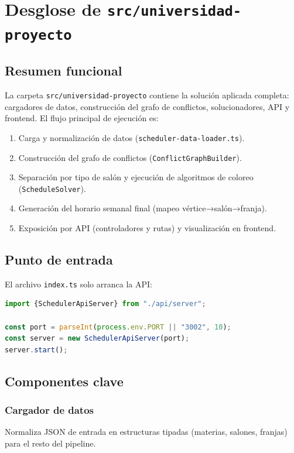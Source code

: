 \chapter{Desglose de \texttt{src/universidad-proyecto}}

\section{Resumen funcional}

La carpeta \texttt{src/universidad-proyecto} contiene la solución aplicada completa: cargadores de datos, construcción del grafo de conflictos, solucionadores, API y frontend. El flujo principal de ejecución es:

\begin{enumerate}[leftmargin=1.5cm]
  \item Carga y normalización de datos (\texttt{scheduler-data-loader.ts}).
  \item Construcción del grafo de conflictos (\texttt{ConflictGraphBuilder}).
  \item Separación por tipo de salón y ejecución de algoritmos de coloreo (\texttt{ScheduleSolver}).
  \item Generación del horario semanal final (mapeo vértice→salón→franja).
  \item Exposición por API (controladores y rutas) y visualización en frontend.
\end{enumerate}

\section{Punto de entrada}

El archivo \texttt{index.ts} solo arranca la API:

\begin{lstlisting}[language=TypeScript,caption={Entrada principal del módulo universitario}]
import {SchedulerApiServer} from "./api/server";

const port = parseInt(process.env.PORT || "3002", 10);
const server = new SchedulerApiServer(port);
server.start();
\end{lstlisting}

\section{Componentes clave}

\subsection{Cargador de datos}
Normaliza JSON de entrada en estructuras tipadas (materias, salones, franjas) para el resto del pipeline.

